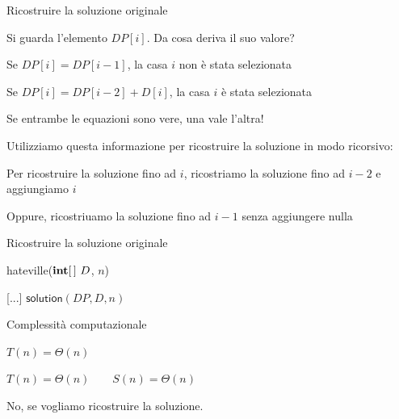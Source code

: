 \begin{frame}[fragile]{Ricostruire la soluzione originale}

\vspace{-9pt}
\BIL
\item Si guarda l'elemento $DP[i]$. Da cosa deriva il suo valore?
  \BI 
  \item Se $DP[i] = DP[i-1]$, la casa $i$ non è stata selezionata
  \item Se $DP[i] = DP[i-2]+D[i]$, la casa $i$ è stata selezionata
  \item Se entrambe le equazioni sono vere, una vale l'altra!
  \EI
\item Utilizziamo questa informazione per ricostruire la soluzione in modo
  ricorsivo:
  \BI
  \item Per ricostruire la soluzione fino ad $i$,
  ricostriamo la soluzione fino ad $i-2$ e aggiungiamo $i$
  \item Oppure, ricostriuamo la soluzione fino ad $i-1$ senza aggiungere nulla
  \EI
\EIL

\end{frame}

\begin{frame}[fragile]{Ricostruire la soluzione originale}

\vspace{-12pt}
{
\begin{Procedure}
\caption[A]{\textsf{hateville}($\INTEGER[\,]\ D$, \INTEGER $n$)}
[...]\;
\Return $\textsf{solution}(DP, D, n)$\;
\end{Procedure}
}
\end{frame}

\begin{frame}{Complessità computazionale}

\vspace{-9pt}
\medskip  
$T(n) = \Theta(n)$

\bigskip
{}
\medskip  
$T(n) = \Theta(n) \qquad S(n) = \Theta(n)$

\bigskip
{}
\medskip
No, se vogliamo ricostruire la soluzione.

\end{frame}

